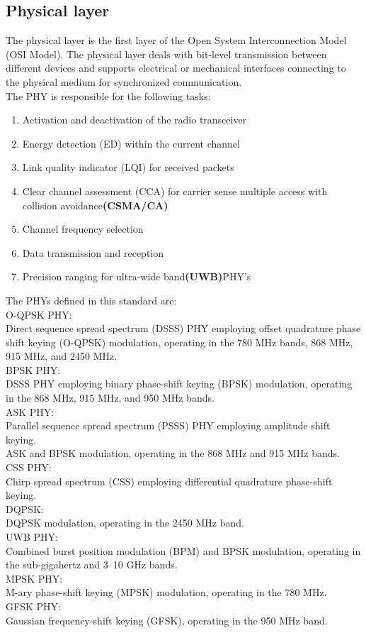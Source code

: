 \subsection{Physical layer}
The physical layer is the first layer of the Open System Interconnection Model (OSI Model). The physical layer deals with bit-level transmission between different devices and supports electrical or mechanical interfaces connecting to the physical medium for synchronized communication.\\
The PHY is responsible for the following tasks:\\
\begin{enumerate}
	\item{Activation and deactivation of the radio transceiver}
	\item {Energy detection (ED) within the current channel}
	\item {Link quality indicator (LQI) for received packets}
	\item {Clear channel assessment (CCA) for carrier sense multiple access with collision avoidance\textbf{(CSMA/CA)}}
	\item {Channel frequency selection}
	\item{Data transmission and reception}
	\item{Precision ranging for ultra-wide band\textbf{(UWB)}PHY's}
\end{enumerate}
The PHYs defined in this standard are:\\
O-QPSK PHY: \\Direct sequence spread spectrum (DSSS) PHY employing offset quadrature phase shift keying (O-QPSK) modulation, operating in the 780 MHz bands, 868 MHz, 915 MHz, and 2450 MHz.\\
BPSK PHY: \\DSSS PHY employing binary phase-shift keying (BPSK) modulation, operating in the 868 MHz, 915 MHz, and 950 MHz bands.\\
ASK PHY: \\Parallel sequence spread spectrum (PSSS) PHY employing amplitude shift keying.\\
ASK and BPSK modulation, operating in the 868 MHz and 915 MHz bands.\\
CSS PHY: \\Chirp spread spectrum (CSS) employing differential quadrature phase-shift keying.\\
DQPSK:\\  DQPSK modulation, operating in the 2450 MHz band.\\
UWB PHY: \\Combined burst position modulation (BPM) and BPSK modulation, operating in the sub-gigahertz and 3–10 GHz bands.\\
MPSK PHY: \\M-ary phase-shift keying (MPSK) modulation, operating in the 780 MHz.\\
GFSK PHY: \\Gaussian frequency-shift keying (GFSK), operating in the 950 MHz band.\\
